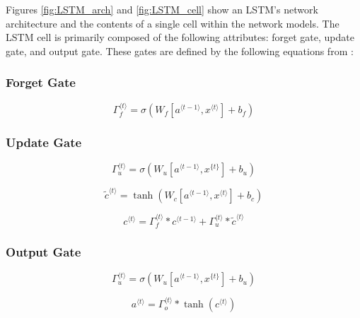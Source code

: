 \documentclass{article}
\begin{document}
Figures \ref{fig:LSTM_arch} and \ref{fig:LSTM_cell} show an LSTM's network architecture and the contents of a single cell within the network models. The LSTM cell is primarily composed of the following attributes: forget gate, update gate, and output gate. These gates are defined by the following equations from \cite{ng_katanforoosh_bensouda_mourri}:

\subsubsection{Forget Gate}

\begin{equation}
\Gamma_f^{\langle t \rangle} = \sigma(W_f[a^{\langle t-1 \rangle}, x^{\langle t \rangle}] + b_f)
\label{eq:forget_gate}
\end{equation}

\subsubsection{Update Gate}

\begin{equation}
\Gamma_u^{\langle t \rangle} = \sigma(W_u[a^{\langle t-1 \rangle}, x^{\{t\}}] + b_u)
\label{eq:update_gate1}
\end{equation}

\begin{equation}
\tilde{c}^{\langle t \rangle} = \tanh(W_c[a^{\langle t-1 \rangle}, x^{\langle t \rangle}] + b_c)
\label{eq:update_gate2}
\end{equation}

\begin{equation}
c^{\langle t \rangle} = \Gamma_f^{\langle t \rangle}* c^{\langle t-1 \rangle} + \Gamma_u^{\langle t \rangle} *\tilde{c}^{\langle t \rangle}
\label{eq:update_gate3}
\end{equation}

\subsubsection{Output Gate}

\begin{equation}
\Gamma_u^{\langle t \rangle} = \sigma(W_u[a^{\langle t-1 \rangle}, x^{\{t\}}] + b_u)
\label{eq:output_gate1}
\end{equation}

\begin{equation}
a^{\langle t \rangle} = \Gamma_o^{\langle t \rangle}* \tanh(c^{\langle t \rangle})
\label{eq:output_gate2}
\end{equation}
\end{document}
